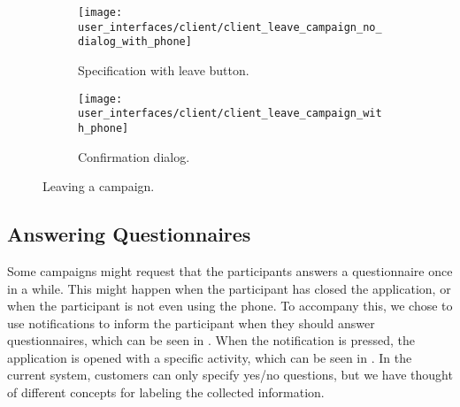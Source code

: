 \begin{figure}[!htbp]
\begin{subfigure}[!t]{.50\textwidth}
  \centering
  \texttt{[image: user\_interfaces/client/client\_leave\_campaign\_no\_dialog\_with\_phone]}
  \caption{Specification with leave button.}
  \label{fig:leave_campaign_no_dialog}
\end{subfigure}%
\begin{subfigure}[!t]{.50\textwidth}
  \centering
  \texttt{[image: user\_interfaces/client/client\_leave\_campaign\_with\_phone]}
  \caption{Confirmation dialog.}
  \label{fig:leave_campaign_dialog}
\end{subfigure}
\caption{Leaving a campaign.}
\label{fig:leave_campaign}
\end{figure}
\FloatBarrier

\subsection{Answering Questionnaires}
\label{sub:answering_questionnaired}

Some campaigns might request that the participants answers a questionnaire once in a while. This might happen when the participant has closed the application, or when the participant is not even using the phone. To accompany this, we chose to use notifications to inform the participant when they should answer questionnaires, which can be seen in . When the notification is pressed, the application is opened with a specific activity, which can be seen in . In the current system, customers can only specify yes/no questions, but we have thought of different concepts for labeling the collected information.

